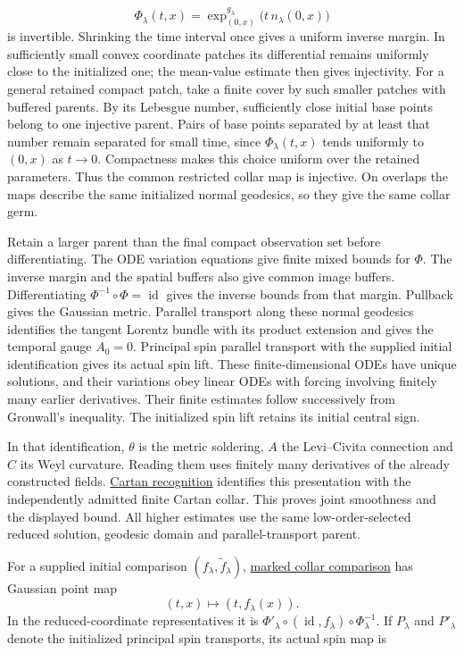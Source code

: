 \documentclass[
  english,
  11pt,
  reqno]{amsart}
\begin{document}
\label{eq:online-initialized-gaussian-family-map} \[
\Phi_\lambda(t,x)=
\exp^{g_\lambda}_{(0,x)}
\bigl(t\,n_\lambda(0,x)\bigr)
\] is invertible. Shrinking the time interval once gives a uniform
inverse margin. In sufficiently small convex coordinate patches its
differential remains uniformly close to the initialized one; the
mean-value estimate then gives injectivity. For a general retained
compact patch, take a finite cover by such smaller patches with buffered
parents. By its Lebesgue number, sufficiently close initial base points
belong to one injective parent. Pairs of base points separated by at
least that number remain separated for small time, since
\(\Phi_\lambda(t,x)\) tends uniformly to \((0,x)\) as \(t\to0\).
Compactness makes this choice uniform over the retained parameters. Thus
the common restricted collar map is injective. On overlaps the maps
describe the same initialized normal geodesics, so they give the same
collar germ.

Retain a larger parent than the final compact observation set before
differentiating. The ODE variation equations give finite mixed bounds
for \(\Phi\). The inverse margin and the spatial buffers also give
common image buffers. Differentiating
\(\Phi^{-1}\circ\Phi=\operatorname{id}\) gives the inverse bounds from
that margin. Pullback gives the Gaussian metric. Parallel transport
along these normal geodesics identifies the tangent Lorentz bundle with
its product extension and gives the temporal gauge \(A_0=0\). Principal
spin parallel transport with the supplied initial identification gives
its actual spin lift. These finite-dimensional ODEs have unique
solutions, and their variations obey linear ODEs with forcing involving
finitely many earlier derivatives. Their finite estimates follow
successively from Gronwall's inequality. The initialized spin lift
retains its initial central sign.

In that identification, \(\theta\) is the metric soldering, \(A\) the
Levi--Civita connection and \(C\) its Weyl curvature. Reading them uses
finitely many derivatives of the already constructed fields.
\hyperref[thm:online-cartan-collar-recognition]{Cartan recognition}
identifies this presentation with the independently admitted finite
Cartan collar. This proves joint smoothness and the displayed bound. All
higher estimates use the same low-order-selected reduced solution,
geodesic domain and parallel-transport parent.

For a supplied initial comparison \((f_\lambda,\widetilde f_\lambda)\),
\hyperref[thm:online-marked-collar-full-hom]{marked collar comparison}
has Gaussian point map \[
(t,x)\longmapsto(t,f_\lambda(x)).
\] In the reduced-coordinate representatives it is
\(\Phi'_\lambda\circ(\operatorname{id},f_\lambda)\circ\Phi_\lambda^{-1}\).
If \(P_\lambda\) and \(P'_\lambda\) denote the initialized principal
spin transports, its actual spin map is
\end{document}
